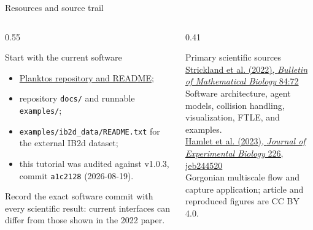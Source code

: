 \documentclass[aspectratio=169,11pt]{beamer}
\begin{document}
\begin{frame}{Resources and source trail}
\begin{columns}[T,onlytextwidth]
\begin{column}{0.55\textwidth}
\begin{block}{Start with the current software}
\begin{itemize}\itemsep4pt
  \item \href{https://github.com/mountaindust/Planktos}{Planktos repository and README};
  \item repository \texttt{docs/} and runnable \texttt{examples/};
  \item \texttt{examples/ib2d\_data/README.txt} for the external IB2d dataset;
  \item this tutorial was audited against v1.0.3, commit \texttt{a1c2128} (2026-08-19).
\end{itemize}
\end{block}
\begin{punchbox}
\centering
Record the exact software commit with every scientific result: current interfaces can differ from those shown in the 2022 paper.
\end{punchbox}
\end{column}
\begin{column}{0.41\textwidth}
\begin{block}{Primary scientific sources}
\small
\href{https://doi.org/10.1007/s11538-022-01027-1}{Strickland et al. (2022), \emph{Bulletin of Mathematical Biology} 84:72}\\[8pt]
Software architecture, agent models, collision handling, visualization, FTLE, and examples.\\[10pt]
\href{https://doi.org/10.1242/jeb.244520}{Hamlet et al. (2023), \emph{Journal of Experimental Biology} 226, jeb244520}\\[8pt]
Gorgonian multiscale flow and capture application; article and reproduced figures are CC BY 4.0.
\end{block}
\end{column}
\end{columns}
\end{frame}
\end{document}
